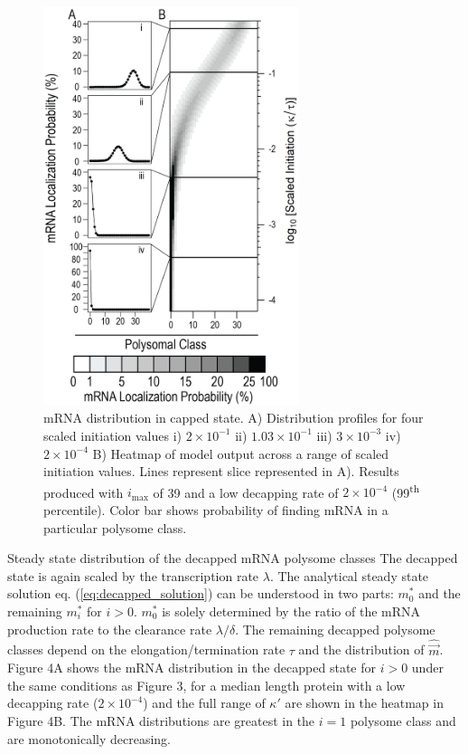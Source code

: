 \documentclass[a4,center,fleqn,nocrop]{NAR}
\newcommand{\imax}{\ensuremath{{i_{\max}}}\xspace}
\newcommand{\mvec}{\ensuremath{\vec{m}}\xspace}
\newcommand{\mvechat}{\ensuremath{\hat{\mvec}}\xspace}
\begin{document}
\begin{figure}[!ht]
\includegraphics[width=75mm]{Images/2023-07-04_Unmarked_slices.png}
\caption{mRNA distribution in capped state. A) Distribution profiles for four scaled initiation values i) $2\times 10^{-1}$ ii) $1.03\times 10^{-1}$ iii) $3\times 10^{-3}$ iv) $2\times 10^{-4}$ B) Heatmap of model output across a range of scaled initiation values. Lines represent slice represented in A). Results produced with \imax of 39 and a low decapping rate of $2\times10^{-4}$  (99\textsuperscript{th} percentile). Color bar shows probability of finding mRNA in a particular polysome class.}
\end{figure}


Steady state distribution of the decapped mRNA polysome classes
The decapped state is again scaled by the transcription rate $\lambda$.
The analytical steady state solution eq. (\ref{eq:decapped_solution}) can be understood in two parts: $m_0^*$ and the remaining $m_i^*$ for $i>0$.
$m_0^*$ is solely determined by the ratio of the mRNA production rate to the clearance rate $\lambda / \delta$.
The remaining decapped polysome classes depend on the elongation/termination rate $\tau$ and the distribution of \mvechat.
 Figure 4A shows the mRNA distribution in the decapped state for $i>0$ under the same conditions as Figure 3, for a median length protein with a low decapping rate ($2\times10^{-4}$) and the full range of $\kappa'$ are shown in the heatmap in Figure 4B.
The mRNA distributions are greatest in the $i=1$ polysome class and are monotonically decreasing. 
 
\end{document}
